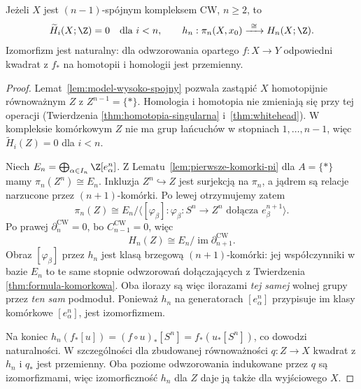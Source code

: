 \begin{twierdzenie}
\label{thm:hurewicz-wyzszy}
Jeżeli $X$ jest
$(n-1)$-spójnym
kompleksem CW,
$n\geq2$, to
\[
 \widetilde H_i(X;\Z)=0
 \quad\text{dla }i<n,
 \qquad
 h_n:\pi_n(X,x_0)
 \xrightarrow{\ \cong\ }H_n(X;\Z).
\]
Izomorfizm jest naturalny:
dla odwzorowania opartego
$f:X\to Y$ odpowiedni
kwadrat z $f_*$ na
homotopii i homologii
jest przemienny.
\end{twierdzenie}
\begin{proof}
Lemat~\ref{lem:model-wysoko-spojny}
pozwala zastąpić
$X$ homotopijnie
równoważnym $Z$
z $Z^{n-1}=\{*\}$.
Homologia i homotopia
nie zmieniają się
przy tej operacji
(Twierdzenia
\ref{thm:homotopia-singularna}
i~\ref{thm:whitehead}).
W kompleksie komórkowym
$Z$ nie ma grup
łańcuchów w
stopniach $1,\ldots,n-1$,
więc
$\widetilde H_i(Z)=0$
dla $i<n$.

Niech
$E_n=\bigoplus_{\alpha\in I_n}
\Z[e_\alpha^n]$.
Z Lematu~\ref{lem:pierwsze-komorki-pi}
dla $A=\{*\}$ mamy
$\pi_n(Z^n)\cong E_n$.
Inkluzja
$Z^n\hookrightarrow Z$
jest surjekcją
na $\pi_n$,
a jądrem są relacje
narzucone przez
$(n+1)$-komórki.
Po lewej otrzymujemy
zatem
\[
 \pi_n(Z)
 \cong
 E_n/\langle
   [\varphi_\beta]:
   \varphi_\beta:S^n\to Z^n
   \text{ dołącza }e_\beta^{n+1}
 \rangle.
\]
Po prawej
$\partial_n^{\mathrm{CW}}=0$,
bo $C_{n-1}^{\mathrm{CW}}=0$,
więc
\[
 H_n(Z)
 \cong E_n/
     \operatorname{im}
       \partial_{n+1}^{\mathrm{CW}}.
\]
Obraz $[\varphi_\beta]$
przez $h_n$ jest
klasą brzegową
$(n+1)$-komórki:
jej współczynniki
w bazie $E_n$
to te same stopnie
odwzorowań dołączających
z Twierdzenia
\ref{thm:formula-komorkowa}.
Oba ilorazy są
więc ilorazami
\emph{tej samej}
wolnej grupy przez
\emph{ten sam}
podmoduł.
Ponieważ $h_n$
na generatorach
$[e_\alpha^n]$
przypisuje im
klasy komórkowe
$[e_\alpha^n]$,
jest izomorfizmem.

Na koniec
$h_n(f_*[u])
=(f\circ u)_*[S^n]
=f_*(u_*[S^n])$,
co dowodzi
naturalności.
W szczególności dla zbudowanej równoważności $q:Z\to X$
kwadrat z $h_n$ i $q_*$ jest przemienny. Oba poziome odwzorowania
indukowane przez $q$ są izomorfizmami, więc izomorficzność
$h_n$ dla $Z$ daje ją także dla wyjściowego $X$.
\end{proof}

